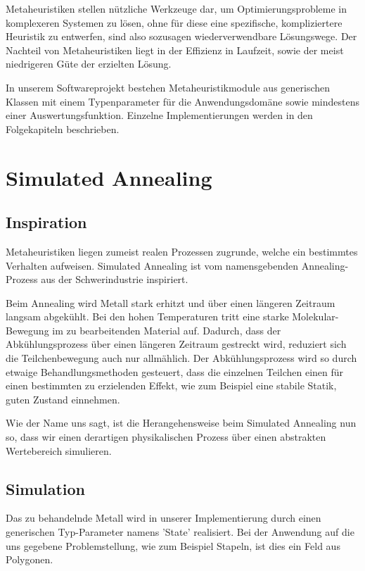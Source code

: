 \documentclass[runningheads,a4paper]{llncs}
\begin{document}
Metaheuristiken stellen nützliche Werkzeuge dar, um Optimierungsprobleme in komplexeren Systemen zu lösen, ohne für diese eine spezifische, kompliziertere Heuristik zu entwerfen, sind also sozusagen wiederverwendbare Lösungswege. Der Nachteil von Metaheuristiken liegt in der Effizienz in Laufzeit, sowie der meist niedrigeren Güte der erzielten Lösung.

In unserem Softwareprojekt bestehen Metaheuristikmodule aus generischen Klassen mit einem Typenparameter für die Anwendungsdomäne sowie mindestens einer Auswertungsfunktion. Einzelne Implementierungen werden in den Folgekapiteln beschrieben.


\section{Simulated Annealing}

\subsection{Inspiration}

Metaheuristiken liegen zumeist realen Prozessen zugrunde, welche ein bestimmtes Verhalten aufweisen. Simulated Annealing ist vom namensgebenden Annealing-Prozess aus der Schwerindustrie inspiriert.

Beim Annealing wird  Metall stark erhitzt und über einen längeren Zeitraum langsam abgekühlt. Bei den hohen Temperaturen tritt eine starke Molekular-Bewegung im zu bearbeitenden Material auf. Dadurch, dass der Abkühlungsprozess über einen längeren Zeitraum gestreckt wird, reduziert sich die Teilchenbewegung auch nur allmählich. Der Abkühlungsprozess wird so durch etwaige Behandlungsmethoden gesteuert, dass die einzelnen Teilchen einen für einen bestimmten zu erzielenden Effekt, wie zum Beispiel eine stabile Statik, guten Zustand einnehmen.

Wie der Name uns sagt, ist die Herangehensweise beim Simulated Annealing nun so, dass wir einen derartigen physikalischen Prozess über einen abstrakten Wertebereich simulieren.

\subsection{Simulation}

Das zu behandelnde Metall wird in unserer Implementierung durch einen generischen Typ-Parameter namens 'State' realisiert. Bei der Anwendung auf die uns gegebene Problemstellung, wie zum Beispiel Stapeln, ist dies ein Feld aus Polygonen.
\end{document}
